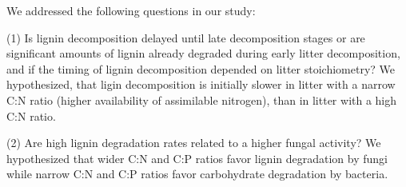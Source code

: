 We addressed the following questions in our study:

(1) Is lignin decomposition delayed until late decomposition stages or are significant amounts of lignin already degraded during early litter decomposition, and if the timing of lignin decomposition depended on litter stoichiometry? We hypothesized, that ligin decomposition is initially slower in litter with a narrow C:N ratio (higher availability of assimilable nitrogen), than in litter with a high C:N ratio.

(2) Are high lignin degradation rates related to a higher fungal activity? We hypothesized that wider C:N and C:P ratios favor lignin degradation by fungi while narrow C:N and C:P ratios favor carbohydrate degradation by bacteria. 